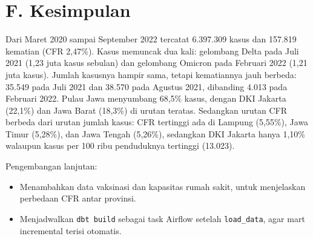 \documentclass[11pt]{article}
\begin{document}
\section*{F. Kesimpulan}

Dari Maret 2020 sampai September 2022 tercatat 6.397.309 kasus dan 157.819
kematian (CFR 2,47\%). Kasus memuncak dua kali: gelombang Delta pada
Juli 2021 (1,23 juta kasus sebulan) dan gelombang Omicron pada Februari 2022
(1,21 juta kasus). Jumlah kasusnya hampir sama, tetapi kematiannya jauh
berbeda: 35.549 pada Juli 2021 dan 38.570 pada Agustus 2021, dibanding 4.013
pada Februari 2022. Pulau Jawa menyumbang 68,5\% kasus, dengan DKI Jakarta
(22,1\%) dan Jawa Barat (18,3\%) di urutan teratas. Sedangkan urutan CFR berbeda
dari urutan jumlah kasus: CFR tertinggi ada di Lampung
(5,55\%), Jawa Timur (5,28\%), dan Jawa Tengah (5,26\%), sedangkan DKI Jakarta
hanya 1,10\% walaupun kasus per 100 ribu penduduknya tertinggi (13.023).

Pengembangan lanjutan:

\begin{itemize}[nosep]
    \item Menambahkan data vaksinasi dan kapasitas rumah sakit, untuk menjelaskan perbedaan CFR antar provinsi.
    \item Menjadwalkan \texttt{dbt build} sebagai task Airflow setelah \texttt{load\_data}, agar mart incremental terisi otomatis.
\end{itemize}
\end{document}
